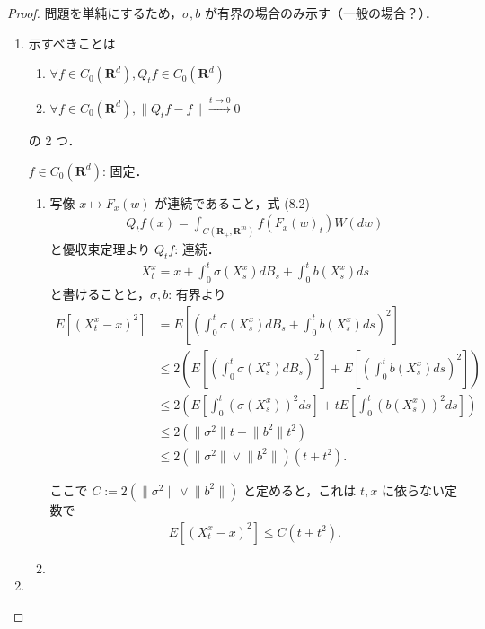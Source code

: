 \documentclass{jsarticle}
\begin{document}
\begin{proof}
    問題を単純にするため，$\sigma, b$ が有界の場合のみ示す（一般の場合？）．
    \begin{enumerate}[label=(\arabic*)]
        \item
        示すべきことは
        \begin{enumerate}[label=(\roman*)]
            \item
            $\forall f\in C_{0}(\mathbf{R}^d), Q_{t}f\in C_{0}(\mathbf{R}^d)$
            \item
            $\forall f\in C_{0}(\mathbf{R}^d), \lVert Q_{t}f-f\rVert\xrightarrow{t\to0}0$
        \end{enumerate}
        の 2 つ．

        $f\in C_{0}(\mathbf{R}^d)$: 固定．
        \begin{enumerate}[label=(\roman*)]
            \item
            写像 $x\mapsto F_{x}(w)$ が連続であること，式 (8.2)
            \begin{align}
                Q_{t}f(x)
                = \int_{C(\mathbf{R_+}, \mathbf{R}^{m})}f(F_{x}(w)_{t})W(dw)
            \end{align}
            と優収束定理より $Q_{t}f$: 連続．
            \begin{align}
                X_{t}^{x}
                = x
                + \int_{0}^{t}\sigma(X_{s}^{x})dB_{s}
                + \int_{0}^{t}b(X_{s}^{x})ds
            \end{align}
            と書けることと，$\sigma, b$: 有界より
            \begin{align}
                E[(X_{t}^{x}-x)^2]
                &= E[(\int_{0}^{t}\sigma(X_{s}^{x})dB_{s}
                + \int_{0}^{t}b(X_{s}^{x})ds)^2] \\
                &\le 2(E[(\int_{0}^{t}\sigma(X_{s}^{x})dB_{s})^2]
                + E[(\int_{0}^{t}b(X_{s}^{x})ds)^2]) \\
                &\le 2(E[\int_{0}^{t}(\sigma(X_{s}^{x}))^{2}ds]
                + tE[\int_{0}^{t}(b(X_{s}^{x}))^{2}ds]) \\
                &\le 2(\lVert \sigma^2\rVert t+\lVert b^2\rVert t^2) \\
                &\le 2(\lVert \sigma^2\rVert\vee\lVert b^2\rVert)(t+t^2).
            \end{align}

            ここで $C:=2(\lVert \sigma^2\rVert\vee\lVert b^2\rVert)$ と定めると，これは $t, x$ に依らない定数で
            \begin{align}
                E[(X_{t}^{x}-x)^2]
                \le C(t+t^2).
                \label{eq:804}
            \end{align}
            \item
            
        \end{enumerate}
        
        \item
        
    \end{enumerate}
\end{proof}
\end{document}
